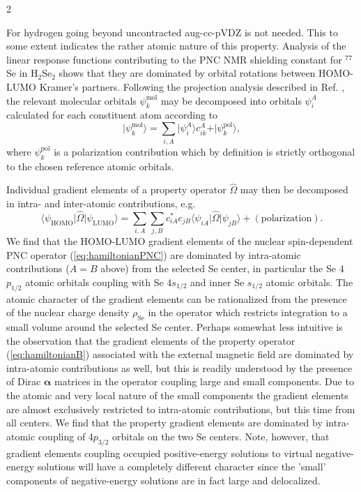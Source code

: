\documentclass[a4paper,12pt,english]{article}
\begin{document}
\begin{spacing}{2}
\par For hydrogen going beyond uncontracted aug-cc-pVDZ is not needed. This to some extent indicates the rather atomic nature of this property. Analysis of the linear response functions contributing to the PNC NMR shielding constant for $^{77}$Se in H$_2$Se$_2$ shows that they are dominated by orbital rotations between HOMO-LUMO Kramer's partners. Following the projection analysis described in Ref. \cite{saue:TlAt}, the relevant molecular orbitals $\psi^\text{mol}_k$ may be decomposed into orbitals $\psi^A_i$ calculated for each constituent atom according to
\begin{equation}
\vert\psi^\text{mol}_k\rangle = \sum_{i,A}\vert\psi^A_i\rangle c_{ik}^A+\vert\psi^\text{pol}_k\rangle,
\end{equation}
where $\psi^\text{pol}_k$ is a polarization contribution which by definition is strictly orthogonal to the 
chosen reference atomic orbitals.

\noindent Individual gradient elements of a property operator $\hat{\Omega}$ may then be decomposed in intra- and inter-atomic contributions, e.g.
\begin{equation}
\langle\psi_\text{HOMO}\vert\hat{\Omega}\vert\psi_\text{LUMO}\rangle =\sum_{i,A}\sum_{j,B}c_{iA}^{*}c_{jB}\langle\psi_{iA}\vert\hat{\Omega}\vert\psi_{jB}\rangle +(\textrm{polarization}).
\end{equation}
We find that the HOMO-LUMO gradient elements of the nuclear spin-dependent PNC operator (\ref{eq:hamiltonianPNC})
are dominated by intra-atomic contributions ($A=B$ above) from the selected Se center, in particular the Se 4$p_{1/2}$
atomic orbitals coupling with Se 4$s_{1/2}$ and inner Se $s_{1/2}$ atomic orbitals. The atomic character of the gradient
elements can be rationalized from the presence of the nuclear charge density $\rho_\text{Se}$ in the operator
which restricts integration to a small volume around the selected Se center.
Perhaps somewhat less intuitive is the observation that the gradient elements of the property operator
(\ref{eq:hamiltonianB}) associated with the external magnetic field are dominated by intra-atomic contributions
as well, but this is readily understood by the presence of Dirac $\boldsymbol{\alpha}$ matrices in the operator coupling large
and small components. Due to the atomic and very local nature of the small components the gradient elements
are almost exclusively restricted to intra-atomic contributions, but this time from all centers. We find that
the property gradient elements are dominated by intra-atomic coupling  of 4$p_{3/2}$ orbitals on the two
Se centers. Note, however, that gradient elements coupling occupied positive-energy solutions to 
virtual negative-energy solutions will have a completely different character since the 'small' components
of negative-energy solutions are in fact large and delocalized.


\end{spacing}
\end{document}
